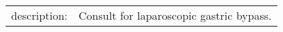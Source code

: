 \begin{table}[h]
    \begin{tabularx}{\textwidth}{|l|X|}
        description:          & Consult for laparoscopic gastric bypass.                                                                                                                                                                                                                                                                                                                                                                                                                                                                                                                                                                                                                                                                                                                                                                                                                                                                                                                                                                                                                                                                                                                                                                                                                                                                                                                                                                                                                                                                                                                                                                                                                                                                                                             \\

\end{tabularx}
\end{table}
